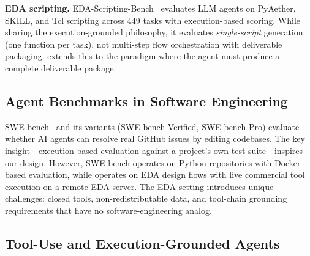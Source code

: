 \textbf{EDA scripting.} EDA-Scripting-Bench~\cite{zhu2026edascript} evaluates LLM agents on PyAether, SKILL, and Tcl scripting across 449 tasks with execution-based scoring. While sharing the execution-grounded philosophy, it evaluates \emph{single-script} generation (one function per task), not multi-step flow orchestration with deliverable packaging. \bench{} extends this to the \mode{} paradigm where the agent must produce a complete deliverable package.

\subsection{Agent Benchmarks in Software Engineering}

SWE-bench~\cite{jimenez2024swebench} and its variants (SWE-bench Verified, SWE-bench Pro) evaluate whether AI agents can resolve real GitHub issues by editing codebases. The key insight---execution-based evaluation against a project's own test suite---inspires our design. However, SWE-bench operates on Python repositories with Docker-based evaluation, while \bench{} operates on EDA design flows with live commercial tool execution on a remote EDA server. The EDA setting introduces unique challenges: closed tools, non-redistributable data, and tool-chain grounding requirements that have no software-engineering analog.

\subsection{Tool-Use and Execution-Grounded Agents}

